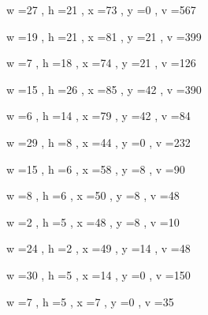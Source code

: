 \documentclass[11pt]{article}
\begin{document}
w =27 , h =21 , x =73 , y =0 , v =567
\par
w =19 , h =21 , x =81 , y =21 , v =399
\par
w =7 , h =18 , x =74 , y =21 , v =126
\par
w =15 , h =26 , x =85 , y =42 , v =390
\par
w =6 , h =14 , x =79 , y =42 , v =84
\par
w =29 , h =8 , x =44 , y =0 , v =232
\par
w =15 , h =6 , x =58 , y =8 , v =90
\par
w =8 , h =6 , x =50 , y =8 , v =48
\par
w =2 , h =5 , x =48 , y =8 , v =10
\par
w =24 , h =2 , x =49 , y =14 , v =48
\par
w =30 , h =5 , x =14 , y =0 , v =150
\par
w =7 , h =5 , x =7 , y =0 , v =35
\par
\newpage
\end{document}
